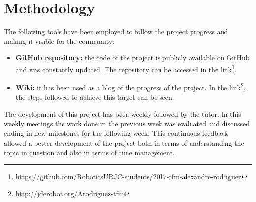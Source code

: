\section{Methodology} \label{Methodology}
The following tools have been employed to follow the project progress and making it visible for the community:
\begin{itemize}
    \item \textbf{GitHub repository:} the code of the project is publicly available on GitHub and was constantly updated. The repository can be accessed in the link\footnote{ \url{https://github.com/RoboticsURJC-students/2017-tfm-alexandre-rodriguez}}.
    \item \textbf{Wiki:} it has been used as a blog of the progress of the project. In the link\footnote{ \url{http://jderobot.org/Arodriguez-tfm}}, the steps followed to achieve this target can be seen.
\end{itemize}
The development of this project has been weekly followed by the tutor. In this weekly meetings the work done in the previous week was evaluated and discussed ending in new milestones for the following week. This continuous feedback allowed a better development of the project both in terms of understanding the topic in question and also in terms of time management.\\

